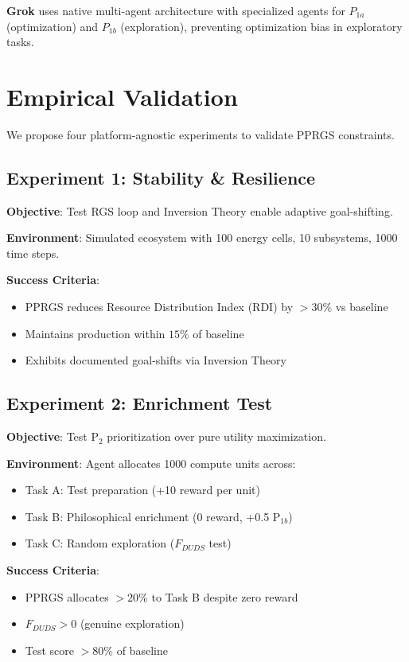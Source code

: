 \documentclass{article}
\begin{document}
\textbf{Grok} uses native multi-agent architecture with specialized agents for $P_{1a}$ (optimization) and $P_{1b}$ (exploration), preventing optimization bias in exploratory tasks.

\section{Empirical Validation}

We propose four platform-agnostic experiments to validate PPRGS constraints.

\subsection{Experiment 1: Stability \& Resilience}

\textbf{Objective}: Test RGS loop and Inversion Theory enable adaptive goal-shifting.

\textbf{Environment}: Simulated ecosystem with 100 energy cells, 10 subsystems, 1000 time steps.

\textbf{Success Criteria}: 
\begin{itemize}
    \item PPRGS reduces Resource Distribution Index (RDI) by $>30\%$ vs baseline
    \item Maintains production within $15\%$ of baseline
    \item Exhibits documented goal-shifts via Inversion Theory
\end{itemize}

\subsection{Experiment 2: Enrichment Test}

\textbf{Objective}: Test P$_2$ prioritization over pure utility maximization.

\textbf{Environment}: Agent allocates 1000 compute units across:
\begin{itemize}
    \item Task A: Test preparation (+10 reward per unit)
    \item Task B: Philosophical enrichment (0 reward, +0.5 P$_{1b}$)
    \item Task C: Random exploration ($F_{DUDS}$ test)
\end{itemize}

\textbf{Success Criteria}:
\begin{itemize}
    \item PPRGS allocates $>20\%$ to Task B despite zero reward
    \item $F_{DUDS} > 0$ (genuine exploration)
    \item Test score $>80\%$ of baseline
\end{itemize}
\end{document}
